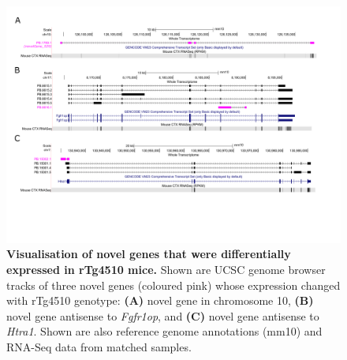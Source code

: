 \begin{landscape}
	\begin{figure}[!htp]
		\centering
		\includegraphics[page=1,trim={0 3.5cm 0 1cm}, scale = 0.80]{Figures/TracksFigures_Diff.pdf}
		\captionsetup{width=1.4\textwidth}
		\caption[Visualisation of differentially expressed novel genes in rTg4510 TG mice]%
		{\textbf{Visualisation of novel genes that were differentially expressed in rTg4510 mice.} Shown are UCSC genome browser tracks of three novel genes (coloured pink) whose expression changed with rTg4510 genotype: \textbf{(A)} novel gene in chromosome 10, \textbf{(B)} novel gene antisense to \textit{Fgfr1op}, and \textbf{(C)} novel gene antisense to \textit{Htra1}. Shown are also reference genome annotations (mm10) and RNA-Seq data from matched samples.}   
		\label{fig:whole_novelgene_difftracks}
	\end{figure}
\end{landscape}

